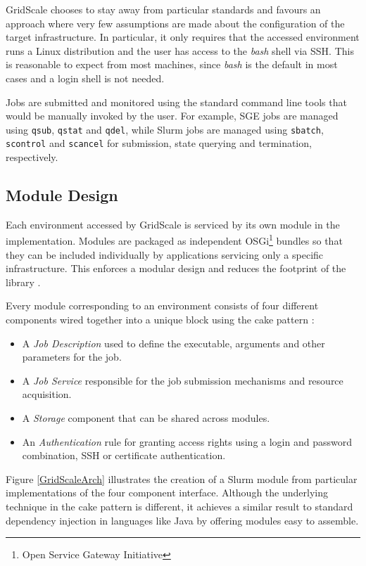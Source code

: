 GridScale chooses to stay away from particular standards and favours an approach where very few assumptions are made about the configuration of the target infrastructure. In particular, it only requires that the accessed environment runs a Linux distribution and the user has access to the \textit{bash} shell via SSH. This is reasonable to expect from most machines, since \textit{bash} is the default in most cases and a login shell is not needed. 

Jobs are submitted and monitored using the standard command line tools that would be manually invoked by the user. For example, SGE jobs are managed using \verb|qsub|, \verb|qstat| and \verb|qdel|, while Slurm jobs are managed using \verb|sbatch|, \verb|scontrol| and \verb|scancel| for submission, state querying and termination, respectively.

\subsection{Module Design}

Each environment accessed by GridScale is serviced by its own module in the implementation. Modules are packaged as independent OSGi\footnote{Open Service Gateway Initiative} \cite{OSGi} bundles so that they can be included individually by applications servicing only a specific infrastructure. This enforces a modular design and reduces the footprint of the library \cite{Reuillon2016}.

Every module corresponding to an environment consists of four different components wired together into a unique block using the cake pattern \cite{Cake}:

\begin{itemize}
	\item A \textit{Job Description} used to define the executable, arguments and other parameters for the job.
	\item A \textit{Job Service} responsible for the job submission mechanisms and resource acquisition.
	\item A \textit{Storage} component that can be shared across modules.
	\item An \textit{Authentication} rule for granting access rights using a login and password combination, SSH or certificate authentication.
\end{itemize}

Figure \ref{GridScaleArch} illustrates the creation of a Slurm module from particular implementations of the four component interface. Although the underlying technique in the cake pattern is different, it achieves a similar result to standard dependency injection in languages like Java by offering modules easy to assemble.

